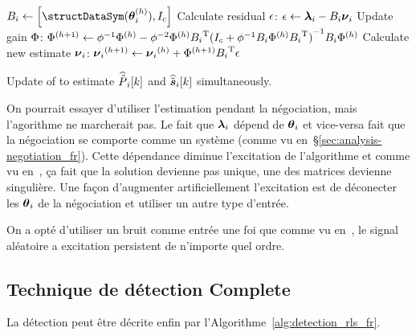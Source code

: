 \documentclass[../main.tex]{subfiles}
\begin{document}
\begin{algorithm2e}[h]
  \DontPrintSemicolon%
  $\rlssysinput\gets\left[\text{\structDataSym}(\thetai\h),I_{c}\right]$\;
  Calculate residual ${\epsilon}$: ${\epsilon}\gets {\boldsymbol{\lambda}_{i}}-{B_i}{\boldsymbol{\nu}_{i}}$\;
  Update gain ${\Phi}$: ${\Phi}^{(h+1)}\gets {\phi}^{-1}{\Phi}^{(h)}-{\phi}^{-2}{\Phi}^{(h)}{B_i}^{\mathrm{T}}{(I_{c}+{\phi}^{-1}{B_i}{\Phi}^{(h)}{B_i}^{\mathrm{T}})}^{-1}{B_i}{\Phi}^{(h)}$\;
  Calculate new estimate ${\boldsymbol{\nu}_{i}}$: ${\boldsymbol{\nu}_{i}}^{(h+1)}\gets{\boldsymbol{\nu}_{i}}^{(h)}+{\Phi}^{(h+1)}{B_i}^{\mathrm{T}}{\epsilon}$\;
  \caption{Update of \RLS{} to estimate $\widehat{\tilde{P}}_{i}[k]$ and $\widehat{\tilde{\boldsymbol{s}}}_{i}[k]$ simultaneously.}\label{alg:update_rls_fr}
\end{algorithm2e}

On pourrait essayer d'utiliser l'estimation pendant la négociation, mais l'agorithme ne marcherait pas.
Le fait que $\boldsymbol{\lambda}_{i}$ dépend de $\boldsymbol{\theta}_{i}$ et vice-versa fait que la négociation se comporte comme un système \dt{} (comme vu en~\S\ref{sec:analysis-negotiation_fr}).
Cette dépendance diminue l'excitation de l'algorithme et comme vu en~\cite{AstroemWittenmark1989}, ça fait que la solution devienne pas unique, une des matrices devienne singulière.
Une façon d'augmenter artificiellement l'excitation est de déconecter les $\boldsymbol{\theta}_{i}$ de la négociation et utiliser un autre type d'entrée.

On a opté d'utiliser un bruit comme entrée une foi que comme vu en~\cite[\S3.4]{AstroemWittenmark1989}, le signal aléatoire a excitation persistent de n'importe quel ordre.

\subsection{Technique de détection Complete }\label{sec:compl-detect-algor_fr}
La détection peut être décrite enfin par l'Algorithme~\ref{alg:detection_rls_fr}.
\end{document}
